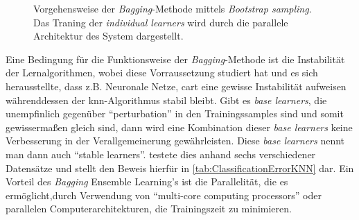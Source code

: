 \begin{figure}[h]
    \caption[Vorgehensweise der \textit{Bagging}-Methode mittels \textit{Bootstrap sampling}.]{Vorgehensweise der \textit{Bagging}-Methode mittels \textit{Bootstrap sampling}. Das Traning der \textit{individual learners} wird durch die parallele Architektur des System dargestellt.}
    \label{fig:bagging}
\end{figure}

\vspace{4ex}

Eine Bedingung für die Funktionsweise der \textit{Bagging}-Methode ist die Instabilität der Lernalgorithmen, wobei \citeauthor[]{Breiman.1996}\autocite[]{Breiman.1996} diese Vorraussetzung studiert hat und es sich herausstellte, dass z.B. Neuronale Netze, \gls{cart} eine gewisse Instabilität aufweisen währenddessen der \gls{knn}-Algorithmus stabil bleibt. Gibt es \textit{base learners}, die unempfinlich gegenüber \enquote{perturbation}\autocite[S.51]{Zhou.2012} in den Trainingssamples sind und somit gewissermaßen gleich sind, dann wird eine Kombination dieser \textit{base learners} keine Verbesserung in der Verallgemeinerung gewährleisten. Diese \textit{base learners} nennt man dann auch \enquote{stable learners}\autocite[S.51]{Zhou.2012}. \citeauthor[]{Breiman.1996}\autocite[]{Breiman.1996} testete dies anhand sechs verschiedener Datensätze und stellt den Beweis hierfür in \autoref{tab:ClassificationErrorKNN} dar.
Ein Vorteil des \textit{Bagging} Ensemble Learning's ist die Parallelität, die es ermöglicht,durch Verwendung von \enquote{multi-core computing processors}\autocite[S.48]{Zhou.2021} oder parallelen Computerarchitekturen, die Trainingszeit zu minimieren.

